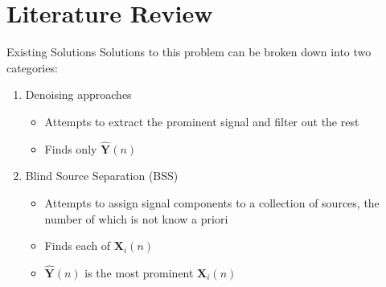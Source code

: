 \documentclass{beamer}
\begin{document}
\section{Literature Review}
\begin{frame}{Existing Solutions}
Solutions to this problem can be broken down into two categories:

\begin{enumerate}
    \item Denoising approaches
    \begin{itemize}
        \item Attempts to extract the prominent signal and filter out the rest
        \item Finds only $\hat{\mathbf{Y}}(n)$
    \end{itemize}
    \item Blind Source Separation (BSS)
    \begin{itemize}
        \item Attempts to assign signal components to a collection of sources, the number of which is not know a priori
        \item Finds each of $\mathbf{X}_i(n)$
        \item $\hat{\mathbf{Y}}(n)$ is the most prominent $\mathbf{X}_i(n)$
    \end{itemize}
\end{enumerate}

\end{frame}
\end{document}
